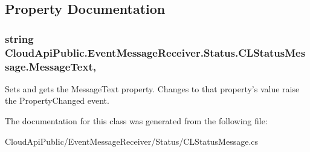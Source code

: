 \subsection{Property Documentation}
\hypertarget{class_cloud_api_public_1_1_event_message_receiver_1_1_status_1_1_c_l_status_message_ae80ea81cad70744384fe86b8c0fb3126}{
\subsubsection[{Message\-Text}]{\setlength{\rightskip}{0pt plus 5cm}string Cloud\-Api\-Public.\-Event\-Message\-Receiver.\-Status.\-C\-L\-Status\-Message.\-Message\-Text\hspace{0.3cm}{\ttfamily [get]}, {\ttfamily [set]}}}\label{class_cloud_api_public_1_1_event_message_receiver_1_1_status_1_1_c_l_status_message_ae80ea81cad70744384fe86b8c0fb3126}


Sets and gets the Message\-Text property. Changes to that property's value raise the Property\-Changed event. 



The documentation for this class was generated from the following file\-:\begin{DoxyCompactItemize}
\item 
Cloud\-Api\-Public/\-Event\-Message\-Receiver/\-Status/C\-L\-Status\-Message.\-cs\end{DoxyCompactItemize}
